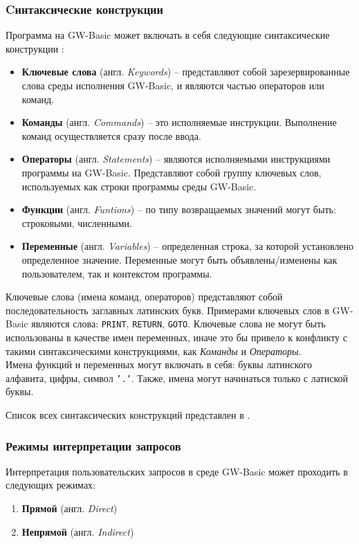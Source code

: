 \documentclass[12pt]{article}
\begin{document}
			\subsubsection{Cинтаксические конструкции}
			\label{subsec:basicKeywords}
			\hspace{\parindent} Программа на GW-Basic может включать в себя следующие синтаксические конструкции \cite{basicManual}:
			\begin{itemize}
				\item {\bf Ключевые слова} (англ. {\it Keywords}) -- представляют собой зарезервированные слова среды исполнения GW-Basic, и являются частью операторов или команд. 				
				\item {\bf Команды} (англ. { \it Commands}) -- это исполняемые инструкции. Выполнение команд осуществляется сразу после ввода.
				\item {\bf Операторы} (англ. {\it Statements}) -- являются исполняемыми инструкциями программы на GW-Basic. Представляют собой группу ключевых слов, используемых как строки программы среды GW-Basic.
				\item {\bf Функции} (англ. {\it Funtions}) -- по типу возвращаемых значений могут быть: строковыми, численными. 
				\item {\bf Переменные} (англ. {\it Variables}) -- определенная строка, за которой установлено определенное значение. Переменные могут быть объявлены/изменены как пользователем, так и контекстом программы.
			\end{itemize}

			\indent Ключевые слова (имена команд, операторов) представляют собой последовательность заглавных латинских букв. Примерами ключевых слов в GW-Basic являются слова: {\tt PRINT}, {\tt RETURN}, {\tt GOTO}. Ключевые слова не могут быть использованы в качестве имен переменных, иначе это бы привело к конфликту с такими синтаксическими конструкциями, как {\it Команды} и {\it Операторы}. \\
			\indent Имена функций и переменных могут включать в себя: буквы латинского алфавита, цифры, символ {\tt '.'}. Также, имена могут начинаться только с латиской буквы.
			
			\indent Список всех синтаксических конструкций представлен в \cite[стр.~117]{basicManual}.
			\subsubsection{Режимы интерпретации запросов}
			\label{subsec:interpTypes}
			\hspace{\parindent} Интерпретация пользовательских запросов в среде GW-Basic может проходить в следующих режимах:
			\begin{enumerate}
				\item {\bf Прямой} (англ. {\it Direct}) 
				\item {\bf Непрямой} (англ. {\it Indirect}) 
			\end{enumerate}
			
\end{document}
